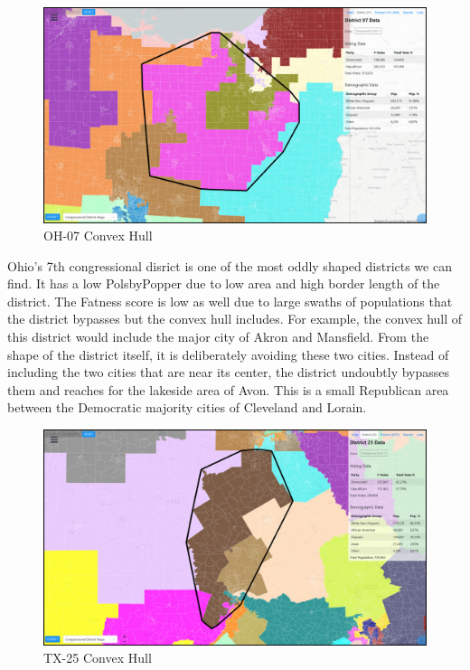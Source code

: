 \documentclass[letterpaper]{article}
\begin{document}
\begin{figure}[H]
	\includegraphics[width=\linewidth]{./figures/OH-07-ConvexHull.png}
	\caption{OH-07 Convex Hull}
	\label{fig:oh07ch}
\end{figure}
Ohio's 7th congressional disrict is one of the most oddly shaped districts we can find. It has a low PolsbyPopper due to low area and high border length of the district. The Fatness score is low as well due to large swaths of populations that the district bypasses but the convex hull includes. For example, the convex hull of this district would include the major city of Akron and Mansfield. From the shape of the district itself, it is deliberately avoiding these two cities. Instead of including the two cities that are near its center, the district undoubtly bypasses them and reaches for the lakeside area of Avon. This is a small Republican area between the Democratic majority cities of Cleveland and Lorain.

\begin{figure}[H]
	\includegraphics[width=\linewidth]{./figures/TX-25-ConvexHull.png}
	\caption{TX-25 Convex Hull}
	\label{fig:tx25ch}
\end{figure}
\end{document}
